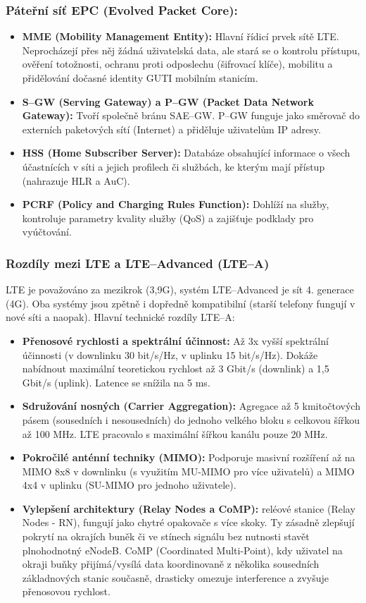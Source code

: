 		\subsubsection*{Páteřní síť EPC (Evolved Packet Core):}
			\begin{itemize}
				\item \textbf{MME (Mobility Management Entity):} Hlavní řídicí prvek sítě LTE. Neprocházejí přes něj žádná uživatelská data, ale stará se o kontrolu přístupu, ověření totožnosti, ochranu proti odposlechu (šifrovací klíče), mobilitu a přidělování dočasné identity GUTI mobilním stanicím.
				\item \textbf{S--GW (Serving Gateway) a P--GW (Packet Data Network Gateway):} Tvoří společně bránu SAE--GW. P--GW funguje jako směrovač do externích paketových sítí (Internet) a přiděluje uživatelům IP adresy.
				\item \textbf{HSS (Home Subscriber Server):} Databáze obsahující informace o všech účastnících v síti a jejich profilech či službách, ke kterým mají přístup (nahrazuje HLR a AuC).
				\item \textbf{PCRF (Policy and Charging Rules Function):} Dohlíží na služby, kontroluje parametry kvality služby (QoS) a zajišťuje podklady pro vyúčtování.
			\end{itemize}
		\subsubsection{Rozdíly mezi LTE a LTE--Advanced (LTE--A)}
		LTE je považováno za mezikrok (3,9G), systém LTE--Advanced je sít 4. generace (4G). Oba systémy jsou zpětně i dopředně kompatibilní (starší telefony fungují v nové síti a naopak).
		Hlavní technické rozdíly LTE--A:
			\begin{itemize}
				\item \textbf{Přenosové rychlosti a spektrální účinnost:} Až 3x vyšší spektrální účinnosti (v downlinku 30 bit/s/Hz, v uplinku 15 bit/s/Hz). Dokáže nabídnout maximální teoretickou rychlost až 3 Gbit/s (downlink) a 1,5 Gbit/s (uplink). Latence se snížila na 5 ms.
				\item \textbf{Sdružování nosných (Carrier Aggregation):} Agregace až 5 kmitočtových pásem (sousedních i nesousedních) do jednoho velkého bloku s celkovou šířkou až 100 MHz. LTE pracovalo s maximální šířkou kanálu pouze 20 MHz.
				\item \textbf{Pokročilé anténní techniky (MIMO):} Podporuje masivní rozšíření až na MIMO 8x8 v downlinku (s využitím MU-MIMO pro více uživatelů) a MIMO 4x4 v uplinku (SU-MIMO pro jednoho uživatele).
				\item \textbf{Vylepšení architektury (Relay Nodes a CoMP):} reléové stanice (Relay Nodes - RN), fungují jako chytré opakovače s více skoky. Ty zásadně zlepšují pokrytí na okrajích buněk či ve stínech signálu bez nutnosti stavět plnohodnotný eNodeB. CoMP (Coordinated Multi-Point), kdy uživatel na okraji buňky přijímá/vysílá data koordinovaně z několika sousedních základnových stanic současně, drasticky omezuje interference a zvyšuje přenosovou rychlost.
			\end{itemize}
	
